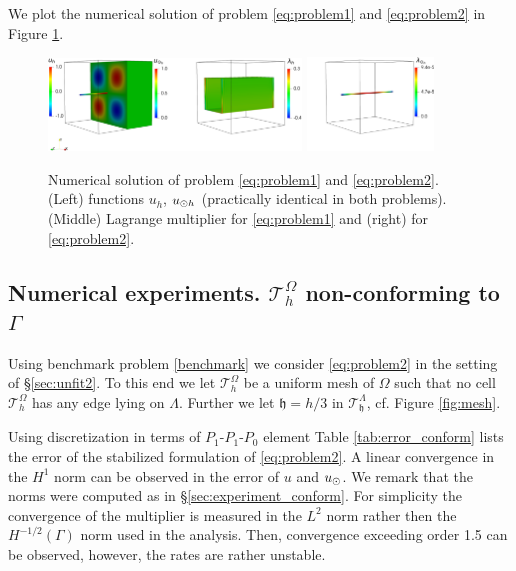 \documentclass[r]{siamart171218}
\begin{document}
We plot the numerical solution of problem \eqref{eq:problem1} and \eqref{eq:problem2} in
Figure \ref{fig:sol_benchm1}.

\begin{figure}
\centering
\includegraphics[width = 0.6\textwidth]{./graphics/mfs_LM2d}
\includegraphics[width = 0.3\textwidth]{./graphics/mfs_LM1d_crop}
\vspace{-10pt}
\caption{Numerical solution of problem \eqref{eq:problem1} and
  \eqref{eq:problem2}. (Left) functions $u_h$, $u_{\odot h}$ (practically identical
  in both problems). (Middle) Lagrange multiplier for \eqref{eq:problem1}
  and (right) for \eqref{eq:problem2}.}
\label{fig:sol_benchm1}
\end{figure}




\subsection{Numerical experiments. $\mathcal{T}^{\Omega}_h$ non-conforming to $\Gamma$}\label{sec:experiment_nonconform}
Using benchmark problem \eqref{benchmark} we consider \eqref{eq:problem2} in the
setting of \S \ref{sec:unfit2}. To this end we let $\mathcal{T}^{\Omega}_h$ be a uniform
mesh of $\Omega$ such that no cell $\mathcal{T}^{\Omega}_h$ has any edge
lying on $\Lambda$. Further we let $\mathfrak{h}=h/3$ in $\mathcal{T}^{\Lambda}_{\mathfrak{h}}$,
cf. Figure \ref{fig:mesh}.

Using discretization in terms of $P_1$-$P_1$-$P_0$ element Table \ref{tab:error_conform}
lists the error of the stabilized formulation of \eqref{eq:problem2}. A linear
convergence in the $H^1$ norm can be observed in the error of $u$ and $u_{\odot}$. We
remark that the norms were computed as in \S\ref{sec:experiment_conform}. For simplicity
the convergence of the multiplier is measured in the $L^2$ norm rather then the $H^{-1/2}(\Gamma)$
norm used in the analysis. Then, convergence exceeding order 1.5 can be observed, however,
the rates are rather unstable.
\end{document}
